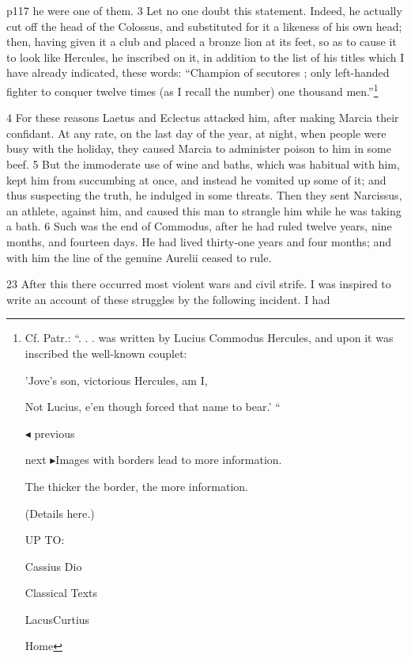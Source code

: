 p117 he were one of them. 3 Let no one doubt this statement. Indeed, he actually cut off the head of the Colossus, and substituted for it a likeness of his own head; then, having given it a club and placed a bronze lion at its feet, so as to cause it to look like Hercules, he inscribed on it, in addition to the list of his titles which I have already indicated, these words: ``Champion of secutores ; only left-handed fighter to conquer twelve times (as I recall the number) one thousand men.''\footnote{Cf. Patr.: ``. . . was written by Lucius Commodus Hercules, and upon it was inscribed the well-known couplet:

'Jove's son, victorious Hercules, am I,

Not Lucius, e'en though forced that name to bear.' ``

\texthebrew{◂} previous

next \texthebrew{▸}Images with borders lead to more information.

The thicker the border, the more information.

(Details here.)

UP TO:

Cassius Dio

Classical Texts

LacusCurtius

Home}

4
For these reasons Laetus and Eclectus attacked him, after making Marcia their confidant. At any rate, on the last day of the year, at night, when people were busy with the holiday, they caused Marcia to administer poison to him in some beef. 5 But the immoderate use of wine and baths, which was habitual with him, kept him from succumbing at once, and instead he vomited up some of it; and thus suspecting the truth, he indulged in some threats. Then they sent Narcissus, an athlete, against him, and caused this man to strangle him while he was taking a bath. 6 Such was the end of Commodus, after he had ruled twelve years, nine months, and fourteen days. He had lived thirty-one years and four months; and with him the line of the genuine Aurelii ceased to rule.

23
After this there occurred most violent wars and civil strife. I was inspired to write an account of these struggles by the following incident. I had

